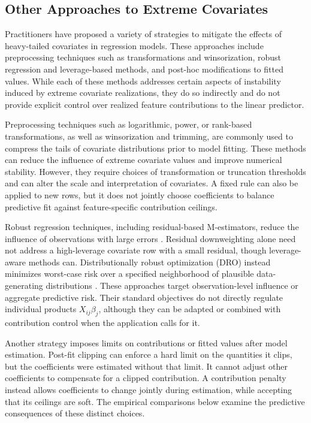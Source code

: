 \documentclass[article,shortnames,nofooter]{jss}
\begin{document}
\subsection{Other Approaches to Extreme Covariates}

Practitioners have proposed a variety of strategies to mitigate the effects of heavy-tailed covariates in regression models. These approaches include preprocessing techniques such as transformations and winsorization, robust regression and leverage-based methods, and post-hoc modifications to fitted values. While each of these methods addresses certain aspects of instability induced by extreme covariate realizations, they do so indirectly and do not provide explicit control over realized feature contributions to the linear predictor.

Preprocessing techniques such as logarithmic, power, or rank-based transformations, as well as winsorization and trimming, are commonly used to compress the tails of covariate distributions prior to model fitting. These methods can reduce the influence of extreme covariate values and improve numerical stability. However, they require choices of transformation or truncation thresholds and can alter the scale and interpretation of covariates. A fixed rule can also be applied to new rows, but it does not jointly choose coefficients to balance predictive fit against feature-specific contribution ceilings.

Robust regression techniques, including residual-based M-estimators, reduce the influence of observations with large errors \citep{huber1973}. Residual downweighting alone need not address a high-leverage covariate row with a small residual, though leverage-aware methods can. Distributionally robust optimization (DRO) instead minimizes worst-case risk over a specified neighborhood of plausible data-generating distributions \citep{bental2009}. These approaches target observation-level influence or aggregate predictive risk. Their standard objectives do not directly regulate individual products $X_{ij}\beta_j$, although they can be adapted or combined with contribution control when the application calls for it.

Another strategy imposes limits on contributions or fitted values after model estimation. Post-fit clipping can enforce a hard limit on the quantities it clips, but the coefficients were estimated without that limit. It cannot adjust other coefficients to compensate for a clipped contribution. A contribution penalty instead allows coefficients to change jointly during estimation, while accepting that its ceilings are soft. The empirical comparisons below examine the predictive consequences of these distinct choices.
\end{document}
